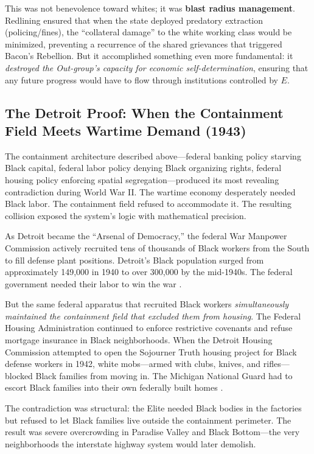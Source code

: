 \documentclass[12pt,openany]{book}
\begin{document}
\medskip

This was not benevolence toward whites; it was \textbf{blast radius management}. Redlining ensured that when the state deployed predatory extraction (policing/fines), the ``collateral damage'' to the white working class would be minimized, preventing a recurrence of the shared grievances that triggered Bacon's Rebellion. But it accomplished something even more fundamental: it \textit{destroyed the Out-group's capacity for economic self-determination}, ensuring that any future progress would have to flow through institutions controlled by $E$.

\subsection{The Detroit Proof: When the Containment Field Meets Wartime Demand (1943)}

The containment architecture described above---federal banking policy starving Black capital, federal labor policy denying Black organizing rights, federal housing policy enforcing spatial segregation---produced its most revealing contradiction during World War II. The wartime economy desperately needed Black labor. The containment field refused to accommodate it. The resulting collision exposed the system's logic with mathematical precision.

As Detroit became the ``Arsenal of Democracy,'' the federal War Manpower Commission actively recruited tens of thousands of Black workers from the South to fill defense plant positions. Detroit's Black population surged from approximately 149,000 in 1940 to over 300,000 by the mid-1940s. The federal government needed their labor to win the war \cite{sugrue_origins}.

But the same federal apparatus that recruited Black workers \textit{simultaneously maintained the containment field that excluded them from housing}. The Federal Housing Administration continued to enforce restrictive covenants and refuse mortgage insurance in Black neighborhoods. When the Detroit Housing Commission attempted to open the Sojourner Truth housing project for Black defense workers in 1942, white mobs---armed with clubs, knives, and rifles---blocked Black families from moving in. The Michigan National Guard had to escort Black families into their own federally built homes \cite{capeci_detroit}.

The contradiction was structural: the Elite needed Black bodies in the factories but refused to let Black families live outside the containment perimeter. The result was severe overcrowding in Paradise Valley and Black Bottom---the very neighborhoods the interstate highway system would later demolish.
\end{document}
